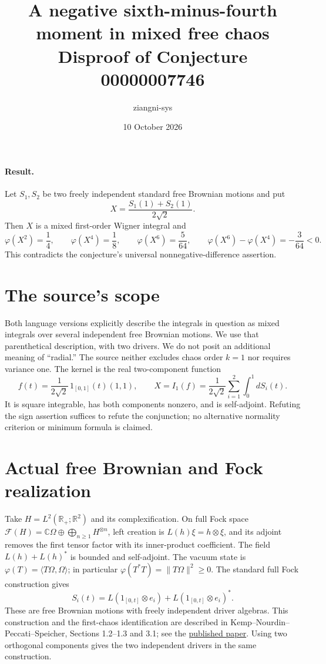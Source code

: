 \documentclass[11pt]{article}
\title{A negative sixth-minus-fourth moment in mixed free chaos\\\large Disproof of Conjecture 00000007746}
\author{ziangni-sys}\date{10 October 2026}
\begin{document}
\maketitle
\paragraph{Result.} Let $S_1,S_2$ be two freely independent standard free Brownian motions and put
\[
 X=\frac{S_1(1)+S_2(1)}{2\sqrt2}.
\]
Then $X$ is a mixed first-order Wigner integral and
\[
 \varphi(X^2)=\frac14,\qquad \varphi(X^4)=\frac18,\qquad
 \varphi(X^6)=\frac5{64},\qquad
 \varphi(X^6)-\varphi(X^4)=-\frac3{64}<0.
\]
This contradicts the conjecture's universal nonnegative-difference assertion.
\section*{The source's scope}
Both language versions explicitly describe the integrals in question as mixed integrals over several independent free Brownian motions. We use that parenthetical description, with two drivers. We do not posit an additional meaning of ``radial.'' The source neither excludes chaos order $k=1$ nor requires variance one. The kernel is the real two-component function
\[
 f(t)=\frac{1}{2\sqrt2}\,1_{[0,1]}(t)(1,1),\qquad
 X=I_1(f)=\frac1{2\sqrt2}\sum_{i=1}^2\int_0^1 dS_i(t).
\]
It is square integrable, has both components nonzero, and is self-adjoint. Refuting the sign assertion suffices to refute the conjunction; no alternative normality criterion or minimum formula is claimed.
\section*{Actual free Brownian and Fock realization}
Take $H=L^2(\mathbb R_+;\mathbb R^2)$ and its complexification. On full Fock space
$\mathcal F(H)=\mathbb C\Omega\oplus\bigoplus_{n\ge1}H^{\otimes n}$,
left creation is $L(h)\xi=h\otimes\xi$, and its adjoint removes the first tensor factor with its inner-product coefficient. The field $L(h)+L(h)^*$ is bounded and self-adjoint. The vacuum state is
$\varphi(T)=\langle T\Omega,\Omega\rangle$; in particular
$\varphi(T^*T)=\|T\Omega\|^2\ge0$.
The standard full Fock construction gives
\[
 S_i(t)=L(1_{[0,t]}\otimes e_i)+L(1_{[0,t]}\otimes e_i)^*.
\]
These are free Brownian motions with freely independent driver algebras. This construction and the first-chaos identification are described in Kemp--Nourdin--Peccati--Speicher, Sections 1.2--1.3 and 3.1; see the \href{https://mathweb.ucsd.edu/~tkemp/KNPS-AoP-2012.pdf}{published paper}. Using two orthogonal components gives the two independent drivers in the same construction.
\end{document}

